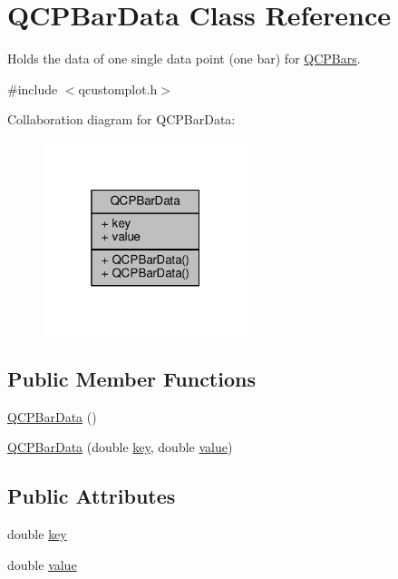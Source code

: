 \hypertarget{class_q_c_p_bar_data}{}\section{Q\+C\+P\+Bar\+Data Class Reference}
\label{class_q_c_p_bar_data}


Holds the data of one single data point (one bar) for \hyperlink{class_q_c_p_bars}{Q\+C\+P\+Bars}.  




{\ttfamily \#include $<$qcustomplot.\+h$>$}



Collaboration diagram for Q\+C\+P\+Bar\+Data\+:\nopagebreak
\begin{figure}[H]
\begin{center}
\leavevmode
\includegraphics[width=169pt]{class_q_c_p_bar_data__coll__graph}
\end{center}
\end{figure}
\subsection*{Public Member Functions}
\begin{DoxyCompactItemize}
\item 
\hyperlink{class_q_c_p_bar_data_a8d214eda9ef41bc6da2a908a09623836}{Q\+C\+P\+Bar\+Data} ()
\item 
\hyperlink{class_q_c_p_bar_data_ac0bb7ede5373a7b18713418fa78f972d}{Q\+C\+P\+Bar\+Data} (double \hyperlink{class_q_c_p_bar_data_afe544b035ef19027ea3d65adeaf81b42}{key}, double \hyperlink{class_q_c_p_bar_data_acab57005d8916d61b64e9ddef6113b60}{value})
\end{DoxyCompactItemize}
\subsection*{Public Attributes}
\begin{DoxyCompactItemize}
\item 
double \hyperlink{class_q_c_p_bar_data_afe544b035ef19027ea3d65adeaf81b42}{key}
\item 
double \hyperlink{class_q_c_p_bar_data_acab57005d8916d61b64e9ddef6113b60}{value}
\end{DoxyCompactItemize}


